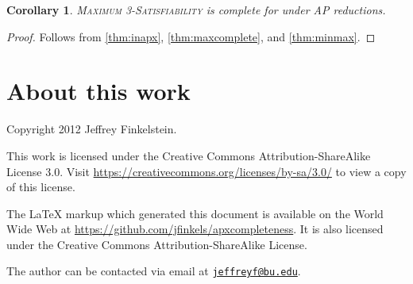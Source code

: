\documentclass[]{article}
\theoremstyle{plain}
\newtheorem{corollary}{Corollary}
\theoremstyle{definition}
\newcommand{\email}[1]{\href{mailto:#1}{\nolinkurl{#1}}}
\begin{document}
\begin{corollary}
  \textsc{Maximum 3-Satisfiability} is complete for \APX{} under AP reductions.
\end{corollary}
\begin{proof}
  Follows from \autoref{thm:inapx}, \autoref{thm:maxcomplete}, and \autoref{thm:minmax}.
\end{proof}

\section*{About this work}

Copyright 2012 Jef{}frey Finkelstein.

This work is licensed under the Creative Commons Attribution-ShareAlike License 3.0.
Visit \mbox{\url{https://creativecommons.org/licenses/by-sa/3.0/}} to view a copy of this license.

The \LaTeX{} markup which generated this document is available on the World Wide Web at \mbox{\url{https://github.com/jfinkels/apxcompleteness}}.
It is also licensed under the Creative Commons Attribution-ShareAlike License.

The author can be contacted via email at \email{jeffreyf@bu.edu}.



\end{document}
